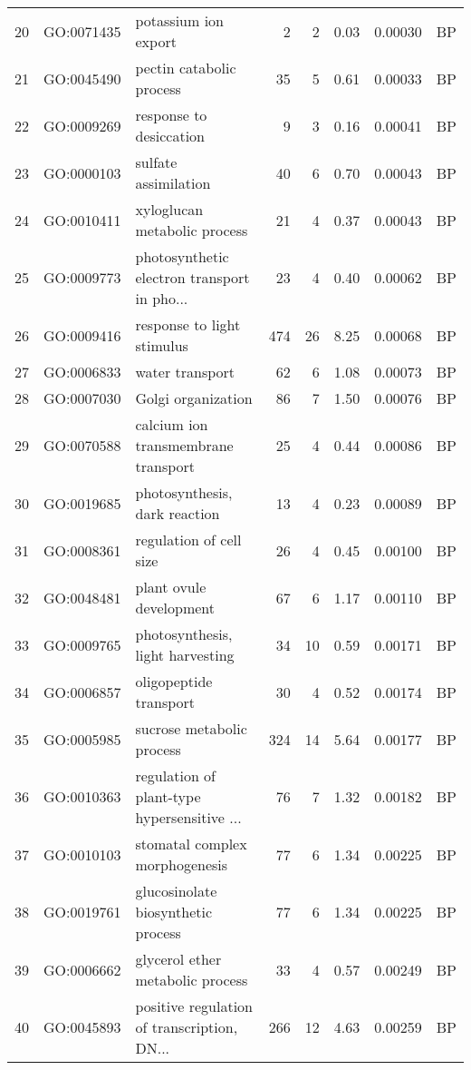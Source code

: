 \documentclass[12pt,oneside,a4paper]{article}
\begin{document}
\begin{longtable}{rllrrrll}
  20 & GO:0071435 & potassium ion export &   2 &   2 & 0.03 & 0.00030 & BP \\ 
  21 & GO:0045490 & pectin catabolic process &  35 &   5 & 0.61 & 0.00033 & BP \\ 
  22 & GO:0009269 & response to desiccation &   9 &   3 & 0.16 & 0.00041 & BP \\ 
  23 & GO:0000103 & sulfate assimilation &  40 &   6 & 0.70 & 0.00043 & BP \\ 
  24 & GO:0010411 & xyloglucan metabolic process &  21 &   4 & 0.37 & 0.00043 & BP \\ 
  25 & GO:0009773 & photosynthetic electron transport in pho... &  23 &   4 & 0.40 & 0.00062 & BP \\ 
  26 & GO:0009416 & response to light stimulus & 474 &  26 & 8.25 & 0.00068 & BP \\ 
  27 & GO:0006833 & water transport &  62 &   6 & 1.08 & 0.00073 & BP \\ 
  28 & GO:0007030 & Golgi organization &  86 &   7 & 1.50 & 0.00076 & BP \\ 
  29 & GO:0070588 & calcium ion transmembrane transport &  25 &   4 & 0.44 & 0.00086 & BP \\ 
  30 & GO:0019685 & photosynthesis, dark reaction &  13 &   4 & 0.23 & 0.00089 & BP \\ 
  31 & GO:0008361 & regulation of cell size &  26 &   4 & 0.45 & 0.00100 & BP \\ 
  32 & GO:0048481 & plant ovule development &  67 &   6 & 1.17 & 0.00110 & BP \\ 
  33 & GO:0009765 & photosynthesis, light harvesting &  34 &  10 & 0.59 & 0.00171 & BP \\ 
  34 & GO:0006857 & oligopeptide transport &  30 &   4 & 0.52 & 0.00174 & BP \\ 
  35 & GO:0005985 & sucrose metabolic process & 324 &  14 & 5.64 & 0.00177 & BP \\ 
  36 & GO:0010363 & regulation of plant-type hypersensitive ... &  76 &   7 & 1.32 & 0.00182 & BP \\ 
  37 & GO:0010103 & stomatal complex morphogenesis &  77 &   6 & 1.34 & 0.00225 & BP \\ 
  38 & GO:0019761 & glucosinolate biosynthetic process &  77 &   6 & 1.34 & 0.00225 & BP \\ 
  39 & GO:0006662 & glycerol ether metabolic process &  33 &   4 & 0.57 & 0.00249 & BP \\ 
  40 & GO:0045893 & positive regulation of transcription, DN... & 266 &  12 & 4.63 & 0.00259 & BP \\ 

\end{longtable}
\end{document}
